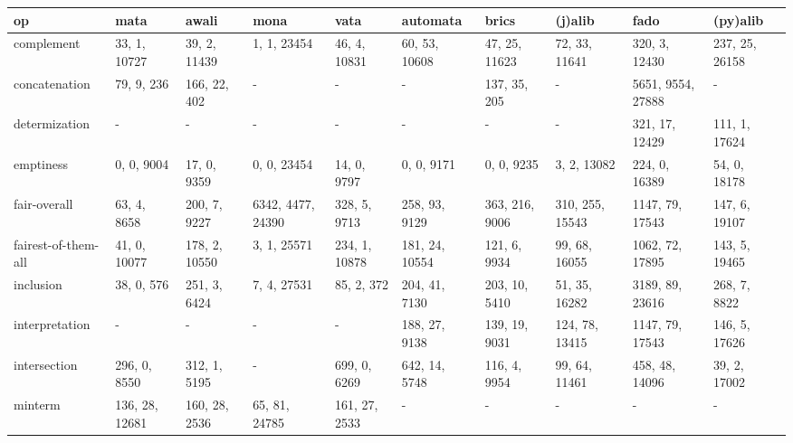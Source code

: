 \begin{tabular}{llllllllll}
\hline
 op                  & mata           & awali         & mona              & vata           & automata       & brics            & (j)alib           & fado              & (py)alib          \\
\hline
 complement          & 33, 1, 10727   & 39, 2, 11439  & 1, 1, 23454       & 46, 4, 10831   & 60, 53, 10608  & 47, 25, 11623    & 72, 33, 11641     & 320, 3, 12430     & 237, 25, 26158    \\
 concatenation       & 79, 9, 236     & 166, 22, 402  & -                 & -              & -              & 137, 35, 205     & -                 & 5651, 9554, 27888 & -                 \\
 determization       & -              & -             & -                 & -              & -              & -                & -                 & 321, 17, 12429    & 111, 1, 17624     \\
 emptiness           & 0, 0, 9004     & 17, 0, 9359   & 0, 0, 23454       & 14, 0, 9797    & 0, 0, 9171     & 0, 0, 9235       & 3, 2, 13082       & 224, 0, 16389     & 54, 0, 18178      \\
 fair-overall        & 63, 4, 8658    & 200, 7, 9227  & 6342, 4477, 24390 & 328, 5, 9713   & 258, 93, 9129  & 363, 216, 9006   & 310, 255, 15543   & 1147, 79, 17543   & 147, 6, 19107     \\
 fairest-of-them-all & 41, 0, 10077   & 178, 2, 10550 & 3, 1, 25571       & 234, 1, 10878  & 181, 24, 10554 & 121, 6, 9934     & 99, 68, 16055     & 1062, 72, 17895   & 143, 5, 19465     \\
 inclusion           & 38, 0, 576     & 251, 3, 6424  & 7, 4, 27531       & 85, 2, 372     & 204, 41, 7130  & 203, 10, 5410    & 51, 35, 16282     & 3189, 89, 23616   & 268, 7, 8822      \\
 interpretation      & -              & -             & -                 & -              & 188, 27, 9138  & 139, 19, 9031    & 124, 78, 13415    & 1147, 79, 17543   & 146, 5, 17626     \\
 intersection        & 296, 0, 8550   & 312, 1, 5195  & -                 & 699, 0, 6269   & 642, 14, 5748  & 116, 4, 9954     & 99, 64, 11461     & 458, 48, 14096    & 39, 2, 17002      \\
 minterm             & 136, 28, 12681 & 160, 28, 2536 & 65, 81, 24785     & 161, 27, 2533  & -              & -                & -                 & -                 & -                 \\

\end{tabular}
